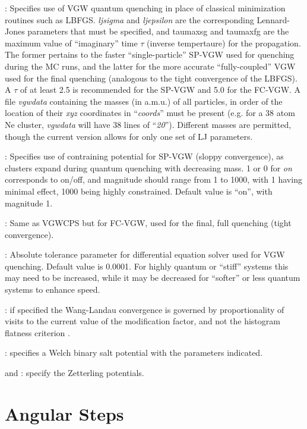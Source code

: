 : Specifies use of VGW quantum quenching in place of
classical minimization routines such as LBFGS. {\it ljsigma} and {\it ljepsilon} are the corresponding Lennard-Jones
parameters that must be specified, and taumaxsg and taumaxfg are the maximum value of ``imaginary'' time $\tau$ (inverse tempertaure) for the propagation.
The former pertains to the faster ``single-particle'' SP-VGW used for quenching during the MC runs, and the latter for the more accurate
``fully-coupled'' VGW used for the final quenching (analogous to the tight convergence of the LBFGS). A $\tau$ of at least
2.5 is recommended for the SP-VGW and 5.0 for the FC-VGW. A file {\it vgwdata} containing the masses (in a.m.u.) of all particles, in order of the location
of their {\it xyz} coordinates in ``{\it coords}'' must be present (e.g. for a 38 atom Ne cluster, {\it vgwdata} will have 38 lines of ``{\it 20}''). Different
masses are permitted, though the current version allows for only one set of LJ parameters. 

: Specifies use of contraining potential for SP-VGW (sloppy convergence), as clusters expand during quantum quenching
with decreasing mass. 1 or 0 for {\it on} corresponds to on/off,
and magnitude should range from 1 to 1000, with 1 having minimal effect, 1000 being highly constrained. Default value is ``on'', with magnitude 1.

: Same as VGWCPS but for FC-VGW, used for the final, full quenching (tight convergence).

: Absolute tolerance parameter for differential equation solver used for VGW quenching. Default value is 0.0001.
For highly quantum or ``stiff'' systems this may need to be increased, while it may be decreased for ``softer'' or less quantum systems to enhance
speed.
 
: if specified the Wang-Landau convergence is governed by proportionality of visits to the current value of
the modification factor, and not the histogram flatness criterion \cite{ZhouB03}.

: specifies a Welch binary
salt potential with the parameters indicated.

 and {\/}: specify the Zetterling potentials.

\section{Angular Steps}

